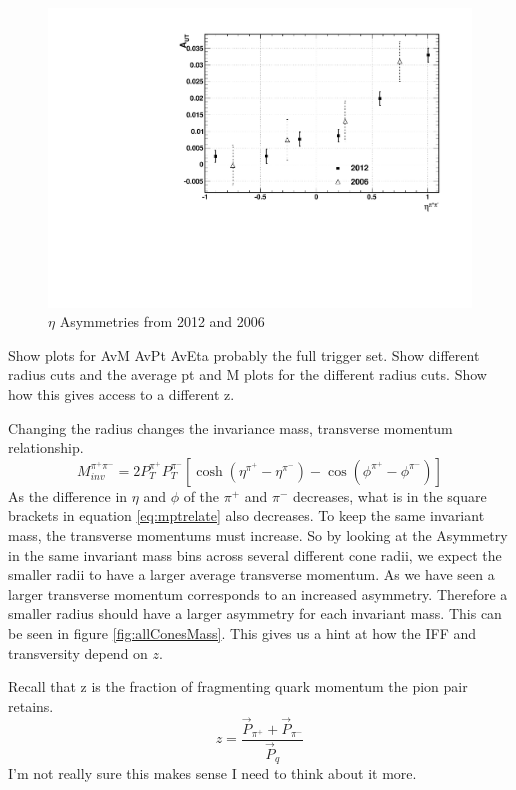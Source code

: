\documentclass[abstract = on,listof=totoc, bibliography=totoc]{scrreprt}
\newcommand{\mpair}{M_{inv}^{\pi^+\pi^-}}
\newcommand{\pip}{\pi^+}
\newcommand{\pim}{\pi^-}
\begin{document}
\begin{figure}
\begin{center}
\includegraphics[width = .7\textwidth]{Eta_comp_old}
\caption[$\eta$ Asymmetries from 2012 and 2006]{$\eta$ Asymmetries from 2012 and 2006}
\label{fig:compEta}
\end{center}
\end{figure}





Show plots for AvM AvPt AvEta probably the full trigger set. Show different radius cuts and the average pt and M plots for the different radius cuts. Show how this gives access to a different z.

Changing the radius changes the invariance mass, transverse momentum relationship. 
\begin{equation}
\label{eq:mptrelate}
\mpair = 2P_T^{\pi^+}P_T^{\pi^-}\left[\cosh \left(\eta^{\pi^+}-\eta^{\pi^-}\right) - \cos \left(\phi^{\pi^+}-\phi^{\pi^-}\right)\right]
\end{equation}
%
As the difference in $\eta$ and $\phi$ of the $\pip$ and $\pim$ decreases, what is in the square brackets in equation \ref{eq:mptrelate} also decreases. To keep the same invariant mass, the transverse momentums must increase. So by looking at the Asymmetry in the same invariant mass bins across several different cone radii, we expect the smaller radii to have a larger average transverse momentum. As we have seen a larger transverse momentum corresponds to an increased asymmetry. Therefore a smaller radius should have a larger asymmetry for each invariant mass. This can be seen in figure \ref{fig:allConesMass}. This gives us a hint at how the IFF and transversity depend on $z$. 

Recall that z is the fraction of fragmenting quark momentum the pion pair retains.
\begin{equation}
\label{eq:mptrelate}
z = \frac{\vec{P}_{\pip} + \vec{P}_{\pim}}{\vec{P}_q}
\end{equation}
%
I'm not really sure this makes sense I need to think about it more.
\end{document}

